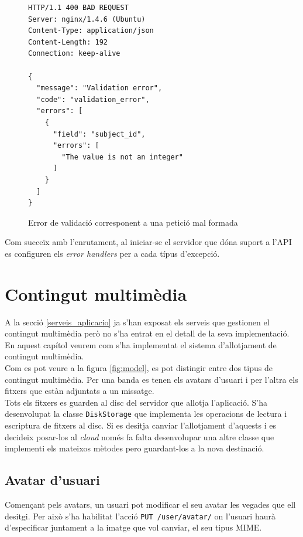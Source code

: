 \begin{figure}[h!]
	\begin{verbatim}
HTTP/1.1 400 BAD REQUEST
Server: nginx/1.4.6 (Ubuntu)
Content-Type: application/json
Content-Length: 192
Connection: keep-alive

{
  "message": "Validation error", 
  "code": "validation_error", 
  "errors": [
    {
      "field": "subject_id", 
      "errors": [
        "The value is not an integer"
      ]
    }
  ]
}
	\end{verbatim}
	\caption{Error de validació corresponent a una petició mal formada}
	\label{fig:validation_error}
\end{figure}
Com succeïx amb l'enrutament, al iniciar-se el servidor que dóna suport a l'\ac{API} es configuren els \emph{error handlers} per a cada típus d'excepció. 
\section{Contingut multimèdia} \label{contingut_multimedia}
A la secció \ref{serveis_aplicacio} ja s'han exposat els serveis que gestionen el contingut multimèdia però no s'ha entrat en el detall de la seva implementació. En aquest capítol veurem com s'ha implementat el sistema d'allotjament de contingut multimèdia.\\

Com es pot veure a la figura \ref{fig:model}, es pot distingir entre dos tipus de contingut multimèdia. Per una banda es tenen els avatars d'usuari i per l'altra els fitxers que estàn adjuntats a un missatge.\\

Tots els fitxers es guarden al disc del servidor que allotja l'aplicació. S'ha desenvolupat la classe \texttt{DiskStorage} que implementa les operacions de lectura i escriptura de fitxers al disc. Si es desitja canviar l'allotjament d'aquests i es decideix posar-los al \emph{cloud} només fa falta desenvolupar una altre classe que implementi els mateixos mètodes pero guardant-los a la nova destinació.\\

\subsection{Avatar d'usuari}

Començant pels avatars, un usuari pot modificar el seu avatar les vegades que ell desitgi. Per això s'ha habilitat l'acció \texttt{PUT /user/avatar/} on l'usuari haurà d'especificar juntament a la imatge que vol canviar, el seu tipus \ac{MIME}.

